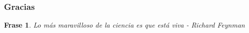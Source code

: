 \documentclass{beamer}
\newtheorem{frase}{Frase}
\begin{document}

\begin{frame}
    \frametitle{Gracias}
    \begin{frase}
        Lo más maravilloso de la ciencia es que está viva - Richard Feynman
    \end{frase}
    
\end{frame}
\end{document}
